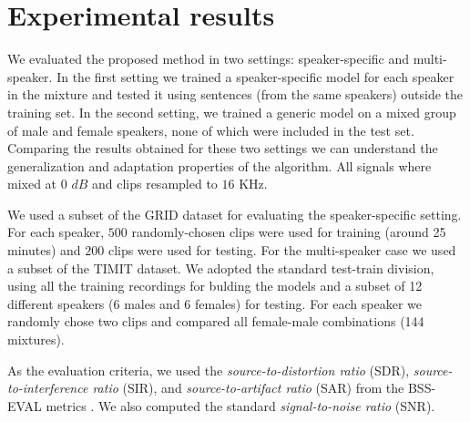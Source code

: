 \section{Experimental results}
\label{sec:experiments}


 We evaluated the proposed method in two settings: speaker-specific and multi-speaker. In the first setting 
we trained a speaker-specific model for each speaker in the mixture and tested it using sentences (from the same speakers) outside the training set. 
In the second setting, we trained a generic model on a mixed group of male and female speakers, none of which were included in the test set.
Comparing the results obtained for these two settings we can understand the generalization and adaptation properties of the algorithm. 
All signals where mixed at 0 $dB$ and clips resampled to $16$ KHz. 

 We used a subset of the GRID dataset \cite{cooke2006audio} for evaluating the speaker-specific setting.
For each speaker, $500$ randomly-chosen clips were used for training (around 25 minutes) and $200$ clips were used for testing.
For the multi-speaker case we used a subset of the TIMIT dataset. We adopted the standard test-train division, using all the training recordings for bulding the models
and a subset of 12 different speakers (6 males and 6 females) for testing. For each speaker we randomly chose two clips and compared
all female-male combinations (144 mixtures). 

 As the evaluation criteria, we used the \emph{source-to-distortion ratio} (SDR), \emph{source-to-interference ratio} (SIR), and
\emph{source-to-artifact ratio} (SAR) from the BSS-EVAL metrics \cite{vincent2006performance}. 
%
We also computed the standard \emph{signal-to-noise ratio} (SNR).
%

